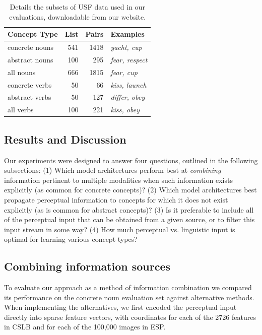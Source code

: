  \begin{table}[t]\begin{center}\begin{tabular}{l|r|r|p{2.1cm}}



\bf Concept Type & \bf  List & \bf Pairs & \bf Examples \\ 

\hline concrete nouns & 541 & 1418 & \emph{yacht, cup} \\

abstract nouns & 100 & 295 & \emph{fear, respect} \\

all nouns & 666 & 1815 & \emph{fear, cup} \\

concrete verbs & 50 & 66 & \emph{kiss, launch} \\

abstract verbs & 50 & 127 & \emph{differ, obey} \\

all verbs & 100 & 221 & \emph{kiss, obey} \\

\end{tabular}\end{center}\caption{\label{font-table} Details the subsets of USF data used in our evaluations, downloadable from our website.}\end{table}






\subsection{Results and Discussion}

Our experiments were designed to answer four questions, outlined in the following subsections: (1) Which model architectures perform best at \emph{combining} information pertinent to multiple modalities when such information exists explicitly (as common for concrete concepts)? (2) Which model architectures best propagate perceptual information to concepts for which it does not exist explicitly (as is common for abstract concepts)? (3) Is it preferable to include all of the perceptual input that can be obtained from a given source, or to filter this input stream in some way? (4) How much perceptual vs. linguistic input is optimal for learning various concept types? 

\subsection{Combining information sources} To evaluate our approach as a method of information combination we compared its performance on the concrete noun evaluation set against alternative methods. When implementing the alternatives, we first encoded the perceptual input directly into sparse feature vectors, with coordinates for each of the 2726 features in CSLB and for each of the 100,000 images in ESP. 

